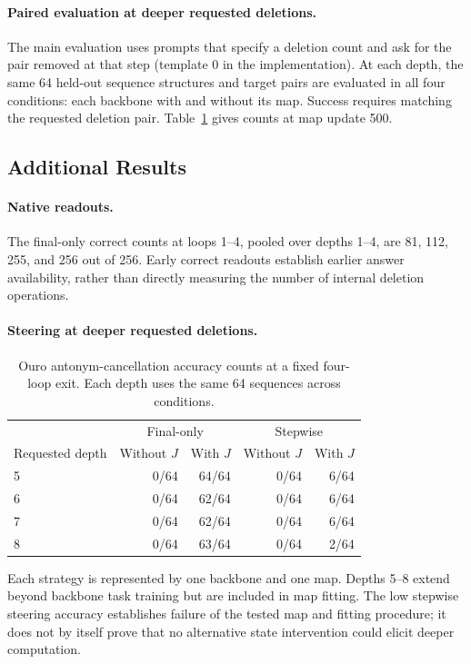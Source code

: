 \documentclass{article}
\begin{document}
\paragraph{Paired evaluation at deeper requested deletions.}
The main evaluation uses prompts that specify a deletion count and ask for the pair removed at that step (template 0 in the implementation). At each depth, the same 64 held-out sequence structures and target pairs are evaluated in all four conditions: each backbone with and without its map. Success requires matching the requested deletion pair. Table~\ref{tab:ouro-fixed4} gives counts at map update 500.

\subsection{Additional Results}
\paragraph{Native readouts.}
The final-only correct counts at loops 1--4, pooled over depths 1--4, are 81, 112, 255, and 256 out of 256. Early correct readouts establish earlier answer availability, rather than directly measuring the number of internal deletion operations.

\paragraph{Steering at deeper requested deletions.}
\begin{table}[!htbp]\centering
\caption{Ouro antonym-cancellation accuracy counts at a fixed four-loop exit. Each depth uses the same 64 sequences across conditions.}
\label{tab:ouro-fixed4}
\begin{tabular}{@{}lrrrr@{}}\toprule
& \multicolumn{2}{c}{Final-only} & \multicolumn{2}{c}{Stepwise}\\
Requested depth & Without $J$ & With $J$ & Without $J$ & With $J$\\\midrule
5 & 0/64 & 64/64 & 0/64 & 6/64 \\
6 & 0/64 & 62/64 & 0/64 & 6/64 \\
7 & 0/64 & 62/64 & 0/64 & 6/64 \\
8 & 0/64 & 63/64 & 0/64 & 2/64 \\
\bottomrule\end{tabular}\end{table}

Each strategy is represented by one backbone and one map. Depths 5--8 extend beyond backbone task training but are included in map fitting. The low stepwise steering accuracy establishes failure of the tested map and fitting procedure; it does not by itself prove that no alternative state intervention could elicit deeper computation.
\end{document}
